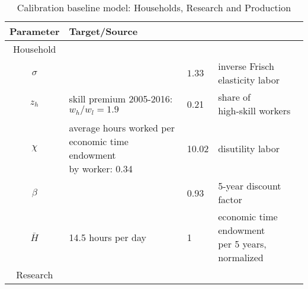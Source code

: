  \thispagestyle{empty}
 \begin{table}[h!]
 	\begin{center}
 		\captionsetup{width=0.9\textwidth}
 		\caption{ Calibration baseline model: Households, Research and Production}
 		\label{tab:calib}
 		\begin{tabular}{c|lll}
 			\hline \hline
 			Parameter& Target/Source& \makecell[l]{Calibration}& \makecell[l]{Meaning}\\ 
 			\hline
 			\hline
 			Household&\multicolumn{3}{c}{}\\
 			\hline 
 			
 			\hline
 			$\sigma$ &  \makecell[l]{\cite{Chetty2011AreMargins}}& $1.33$ & inverse Frisch elasticity labor  \\
 			\hline
 			$z_h$& \makecell[l]{skill premium 2005-2016:\\ $w_h/w_l=1.9$\\ \citep{Slavik2020WagePremium}}&0.21&\makecell[l]{share of\\ high-skill workers} \\	
 			\hline			
 			$\chi$ &  \makecell[l]{average hours worked per\\ economic time endowment\\ by worker: 0.34 \cite{OECDHoursworked}}& 10.02 & disutility labor \\
 			\hline
 			$\beta$ &  \makecell[l]{\cite{Barrage2019OptimalPolicy}}& 0.93 & 5-year discount factor  \\
 			\hline
 			$\bar{H}$& \makecell[l]{14.5 hours per day\\ \cite{Jones1993OptimalGrowth}}&1&\makecell[l]{economic time endowment \\per 5 years, normalized} \\
 			\hline
 			\hline
 			Research&\multicolumn{3}{c}{}\\
 			\hline
 			

\end{tabular}
\end{center}
\end{table}

